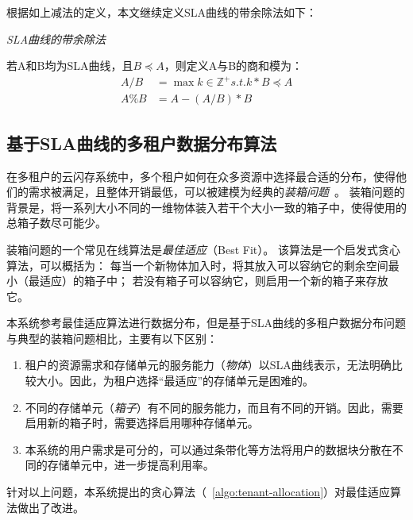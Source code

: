 根据如上减法的定义，本文继续定义SLA曲线的带余除法如下：

\begin{definition}
  \textit{SLA曲线的带余除法}

  若A和B均为SLA曲线，且$B \preceq A$，则定义A与B的商和模为：
  \begin{equation}
    \begin{split}
      A / B & = \max k \in \mathbb{Z}^{+} s.t. k * B \preceq A \\
      A \% B & = A - (A / B) * B
    \end{split}
  \end{equation}
\end{definition}


\subsection{基于SLA曲线的多租户数据分布算法}
\label{sec:design-allocation-algo}

在多租户的云闪存系统中，多个租户如何在众多资源中选择最合适的分布，使得他们的需求被满足，且整体开销最低，可以被建模为经典的\textit{装箱问题}~\cite{wiki:Bin-packing}。
装箱问题的背景是，将一系列大小不同的一维物体装入若干个大小一致的箱子中，使得使用的总箱子数尽可能少。

装箱问题的一个常见在线算法是\textit{最佳适应}（Best Fit）。
该算法是一个启发式贪心算法，可以概括为：
每当一个新物体加入时，将其放入可以容纳它的剩余空间最小（最适应）的箱子中；
若没有箱子可以容纳它，则启用一个新的箱子来存放它。

本系统参考最佳适应算法进行数据分布，但是基于SLA曲线的多租户数据分布问题与典型的装箱问题相比，主要有以下区别：

\begin{enumerate}
  \item 租户的资源需求和存储单元的服务能力（\textit{物体}）以SLA曲线表示，无法明确比较大小。因此，为租户选择“最适应”的存储单元是困难的。
  \item 不同的存储单元（\textit{箱子}）有不同的服务能力，而且有不同的开销。因此，需要启用新的箱子时，需要选择启用哪种存储单元。
  \item 本系统的用户需求是可分的，可以通过条带化等方法将用户的数据块分散在不同的存储单元中，进一步提高利用率。
\end{enumerate}

针对以上问题，本系统提出的贪心算法（~\autoref{algo:tenant-allocation}）对最佳适应算法做出了改进。

